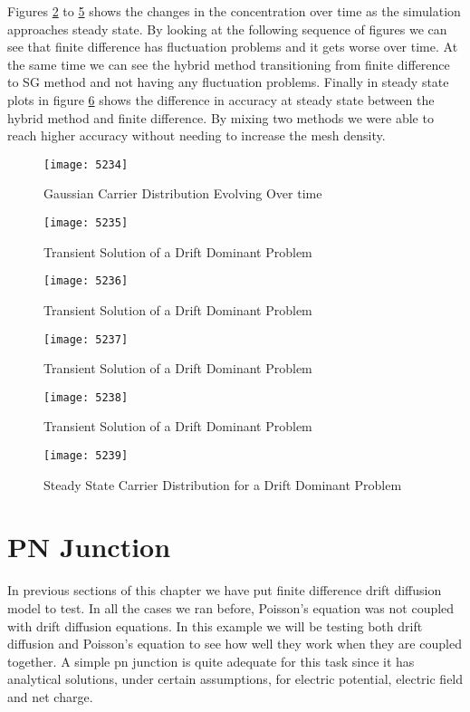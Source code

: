Figures \ref{57} to \ref{60} shows the changes in the concentration over time as the simulation approaches steady state. By looking at the following sequence of figures we can see that finite difference has fluctuation problems and it gets worse over time. At the same time we can see the hybrid method transitioning from finite difference to SG method and not having any fluctuation problems. Finally in steady state plots in figure \ref{61} shows the difference in accuracy at steady state between the hybrid method and finite difference. By mixing two methods we were able to reach higher accuracy without needing to increase the mesh density.

\begin{figure}[ht]
\centering
\texttt{[image: 5234]}
\caption{Gaussian Carrier Distribution Evolving Over time} 
\label{56}
\end{figure}

\begin{figure}[ht]
\centering
\texttt{[image: 5235]}
\caption{Transient Solution of a Drift Dominant Problem} 
\label{57}
\end{figure}

\begin{figure}[ht]
\centering
\texttt{[image: 5236]}
\caption{Transient Solution of a Drift Dominant Problem} 
\label{58}
\end{figure}

\begin{figure}[ht]
\centering
\texttt{[image: 5237]}
\caption{Transient Solution of a Drift Dominant Problem } 
\label{59}
\end{figure}

\begin{figure}[ht]
\centering
\texttt{[image: 5238]}
\caption{Transient Solution of a Drift Dominant Problem } 
\label{60}
\end{figure}

\begin{figure}[ht]
\centering
\texttt{[image: 5239]}
\caption{Steady State Carrier Distribution for a Drift Dominant Problem} 
\label{61}
\end{figure}

\clearpage
\section{PN Junction}
In previous sections of this chapter we have put finite difference drift diffusion model to test. In all the cases we ran before, Poisson's equation was not coupled with drift diffusion equations. In this example we will be testing both drift diffusion and Poisson's equation to see how well they work when they are coupled together. A simple pn junction is quite adequate for this task since it has analytical solutions, under certain assumptions, for electric potential, electric field and net charge.

